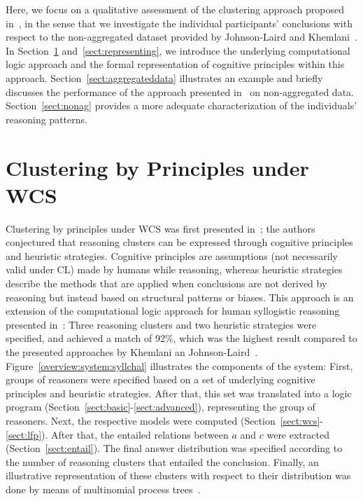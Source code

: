 \documentclass[12pt]{article}
\begin{document}
Here, we focus on a qualitative assessment of the clustering approach proposed in~\cite{declare:2017},
in the sense that we investigate the individual participants' conclusions with respect to the non-aggregated dataset provided by Johnson-Laird and Khemlani~\cite{khemlani:2016}.
In Section~\ref{sect:wcsclustering} and~\ref{sect:representing}, we introduce the underlying computational logic approach and the formal representation of cognitive principles within this approach. Section~\ref{sect:aggregateddata} illustrates an example and briefly discusses the performance of the approach presented in~\cite{declare:2017} on non-aggregated data.
Section~\ref{sect:nonag} provides a more adequate characterization of the individuals' reasoning patterns.

\section{Clustering by Principles under WCS} \label{sect:wcsclustering}

Clustering by principles under WCS was first presented in~\cite{declare:2017};
the authors conjectured that reasoning clusters can be expressed through cognitive principles and heuristic strategies. Cognitive principles are assumptions (not necessarily valid under CL) made by humans while reasoning, 
whereas heuristic strategies describe the methods that are applied when
conclusions are not derived by reasoning but instead based on structural patterns or {biases}.
This approach is an extension of the computational logic approach for human syllogistic reasoning presented in~\cite{cogsci:2017}: Three reasoning clusters and two heuristic strategies were specified, and achieved a match of 92\;\%, which was the highest result compared to the presented approaches by Khemlani an Johnson-Laird~\cite{khemlani:2012}.
Figure~\ref{overview:system:syllchal} illustrates the components of the system:
First, groups of reasoners were specified based on a set of underlying cognitive principles and heuristic strategies.
After that, this set was translated into a logic program (Section~\ref{sect:basic}-\ref{sect:advanced}), representing the group of reasoners.
Next, the respective models were computed (Section~\ref{sect:wcs}-\ref{sect:lfp}).
After that, the entailed relations between $a$ and $c$ were extracted (Section~\ref{sect:entail}). 
 The final answer distribution was specified according to the number of reasoning clusters 
that entailed the conclusion.
Finally, an illustrative representation of these clusters with respect to their distribution was done by means of multinomial process trees~\cite{Riefer1988}.
\end{document}
